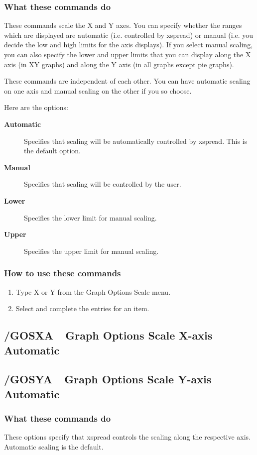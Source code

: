 \subsubsection*{What these commands do}
These commands scale the X and Y axes.  You can specify whether the 
ranges which are displayed are automatic (i.e. controlled by xspread) 
or manual (i.e. you decide the low and high limits for the axis 
displays).  If you select manual scaling, you can also specify the 
lower and upper limits that you can display along the X axis (in XY 
graphs) and along the Y axis (in all graphs except pie graphs).

These commands are independent of each other.  You can have automatic 
scaling on one axis and manual scaling on the other if you so choose.

Here are the options:
\begin{description}
\item[{\bf Automatic}]{Specifies that scaling will be automatically
        controlled by xspread.  This is the default option.}
\item[{\bf Manual}]{Specifies that scaling will be controlled by the
        user.}
\item[{\bf Lower }]{Specifies the lower limit for manual scaling.}
\item[{\bf Upper }]{Specifies the upper limit for manual scaling.}
\end{description}

\subsubsection*{How to use these commands}
\begin{enumerate}
\item{Type X or Y from the Graph Options Scale menu.}
\item{Select and complete the entries for an item.}
\end{enumerate}

\subsection*{/GOSXA\ \   Graph Options Scale X-axis Automatic}
\subsection*{/GOSYA\ \   Graph Options Scale Y-axis Automatic}

\subsubsection*{What these commands do}
These options specify that xspread controls the scaling along the 
respective axis.  Automatic scaling is the default.

